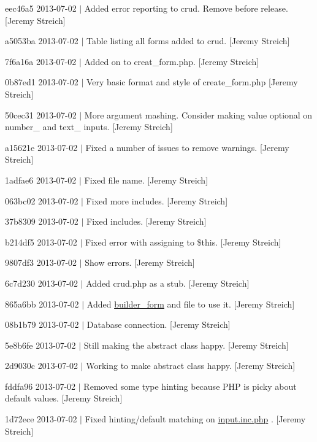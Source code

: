\begin{DoxyItemize}
\item eec46a5 2013-\/07-\/02 $|$ Added error reporting to crud. Remove before release. \mbox{[}Jeremy Streich\mbox{]}
\item a5053ba 2013-\/07-\/02 $|$ Table listing all forms added to crud. \mbox{[}Jeremy Streich\mbox{]}
\item 7f6a16a 2013-\/07-\/02 $|$ Added on to creat\-\_\-form.\-php. \mbox{[}Jeremy Streich\mbox{]}
\item 0b87ed1 2013-\/07-\/02 $|$ Very basic format and style of create\-\_\-form.\-php \mbox{[}Jeremy Streich\mbox{]}
\item 50cec31 2013-\/07-\/02 $|$ More argument mashing. Consider making value optional on number\-\_\- and text\-\_\- inputs. \mbox{[}Jeremy Streich\mbox{]}
\item a15621e 2013-\/07-\/02 $|$ Fixed a number of issues to remove warnings. \mbox{[}Jeremy Streich\mbox{]}
\item 1adfae6 2013-\/07-\/02 $|$ Fixed file name. \mbox{[}Jeremy Streich\mbox{]}
\item 063bc02 2013-\/07-\/02 $|$ Fixed more includes. \mbox{[}Jeremy Streich\mbox{]}
\item 37b8309 2013-\/07-\/02 $|$ Fixed includes. \mbox{[}Jeremy Streich\mbox{]}
\item b214df5 2013-\/07-\/02 $|$ Fixed error with assigning to \$this. \mbox{[}Jeremy Streich\mbox{]}
\item 9807df3 2013-\/07-\/02 $|$ Show errors. \mbox{[}Jeremy Streich\mbox{]}
\item 6c7d230 2013-\/07-\/02 $|$ Added crud.\-php as a stub. \mbox{[}Jeremy Streich\mbox{]}
\item 865a6bb 2013-\/07-\/02 $|$ Added \hyperlink{classbuilder__form}{builder\-\_\-form} and file to use it. \mbox{[}Jeremy Streich\mbox{]}
\item 08b1b79 2013-\/07-\/02 $|$ Database connection. \mbox{[}Jeremy Streich\mbox{]}
\item 5e8b6fe 2013-\/07-\/02 $|$ Still making the abstract class happy. \mbox{[}Jeremy Streich\mbox{]}
\item 2d9030c 2013-\/07-\/02 $|$ Working to make abstract class happy. \mbox{[}Jeremy Streich\mbox{]}
\item fddfa96 2013-\/07-\/02 $|$ Removed some type hinting because P\-H\-P is picky about default values. \mbox{[}Jeremy Streich\mbox{]}
\item 1d72ece 2013-\/07-\/02 $|$ Fixed hinting/default matching on \hyperlink{input_8inc_8php}{input.\-inc.\-php} . \mbox{[}Jeremy Streich\mbox{]}

\end{DoxyItemize}
